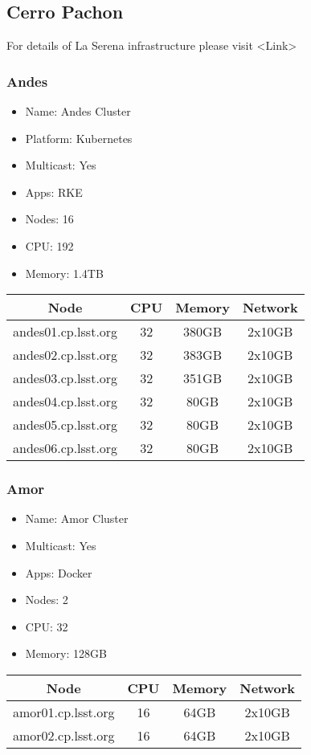 \newpage
\subsection{Cerro Pachon}
For details of La Serena infrastructure please visit <Link>

\subsubsection{Andes}
\begin{itemize}
  \itemsep0em 
  \item Name:      Andes Cluster
  \item Platform:  Kubernetes
  \item Multicast: Yes
  \item Apps:      RKE
  \item Nodes:     16
  \item CPU:       192
  \item Memory:    1.4TB
\end{itemize}
\begin{center}
  \small
  \begin{tabular}{||c c c c||} 
    \hline
    Node & CPU & Memory & Network \\ [0.5ex]
    \hline
    andes01.cp.lsst.org & 32 & 380GB & 2x10GB \\
    \hline
    andes02.cp.lsst.org & 32 & 383GB & 2x10GB \\
    \hline
    andes03.cp.lsst.org & 32 & 351GB & 2x10GB \\
    \hline
    andes04.cp.lsst.org & 32 & 80GB & 2x10GB \\
    \hline
    andes05.cp.lsst.org & 32 & 80GB & 2x10GB \\
    \hline
    andes06.cp.lsst.org & 32 & 80GB & 2x10GB \\
    \hline
  \end{tabular}
\end{center}

\newpage
\subsubsection{Amor}
\begin{itemize}
  \itemsep0em 
  \item Name:      Amor Cluster
  \item Multicast: Yes
  \item Apps:      Docker
  \item Nodes:     2
  \item CPU:       32
  \item Memory:    128GB
\end{itemize}
\begin{center}
  \small
  \begin{tabular}{||c c c c||}
    \hline
    Node & CPU & Memory & Network \\ [0.5ex]
    \hline
    amor01.cp.lsst.org & 16 & 64GB & 2x10GB \\
    \hline
    amor02.cp.lsst.org & 16 & 64GB & 2x10GB \\
    \hline
  \end{tabular}
\end{center}

